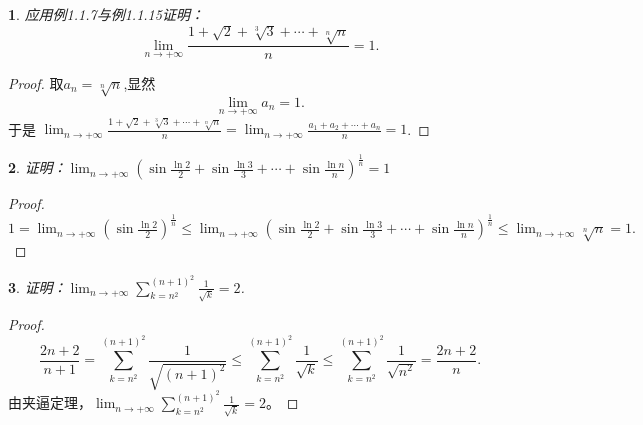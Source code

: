 \documentclass[utf8]{book}
\newtheorem{example}{}[section]             %
\begin{document}
\begin{example}
应用例1.1.7与例1.1.15证明：
$$\displaystyle \lim_{n\to +\infty}\frac{1+\sqrt{2}+\sqrt[3]{3}+\cdots+\sqrt[n]{n}}{n} = 1.$$
\end{example}
\begin{proof}
取$a_n = \sqrt[n]{n}$,显然$$\displaystyle \lim_{n\to +\infty}a_n=1.$$于是
$\displaystyle \lim_{n\to +\infty}\frac{1+\sqrt{2}+\sqrt[3]{3}+\cdots+\sqrt[n]{n}}{n} = \displaystyle \lim_{n\to +\infty}\frac{a_1+a_2+\cdots+a_n}{n} = 1$.
\end{proof}
\begin{example}
证明：$\displaystyle \lim_{n\to +\infty}\left(\sin\frac{\ln 2}{2}+\sin\frac{\ln 3}{3} +\cdots+\sin\frac{\ln n}{n}\right)^{\frac{1}{n}} = 1$
\end{example}
\begin{proof}
$1=\displaystyle \lim_{n\to +\infty}\left(\sin\frac{\ln 2}{2}\right)^{\frac{1}{n}}\leq\displaystyle \lim_{n\to +\infty}\left(\sin\frac{\ln 2}{2}+\sin\frac{\ln 3}{3} +\cdots+\sin\frac{\ln n}{n}\right)^{\frac{1}{n}}\leq \displaystyle \lim_{n\to +\infty}\sqrt[n]{n} = 1.
$\end{proof}
\begin{example}
证明：$\displaystyle \lim_{n\to +\infty}\displaystyle\sum_{k=n^2}^{(n+1)^2}\frac{1}{\sqrt k}= 2$.
\end{example}
\begin{proof}
$$\frac{2n+2}{n+1} = \displaystyle\sum_{k=n^2}^{(n+1)^2}\frac{1}{\sqrt{(n+1)^2}} \leq \displaystyle\sum_{k=n^2}^{(n+1)^2}\frac{1}{\sqrt k} \leq \displaystyle\sum_{k=n^2}^{(n+1)^2}\frac{1}{\sqrt{n^2}} = \frac{2n+2}{n}.$$
由夹逼定理，$\displaystyle \lim_{n\to +\infty}\displaystyle\sum_{k=n^2}^{(n+1)^2}\frac{1}{\sqrt k}= 2$。
\end{proof}
\end{document}
